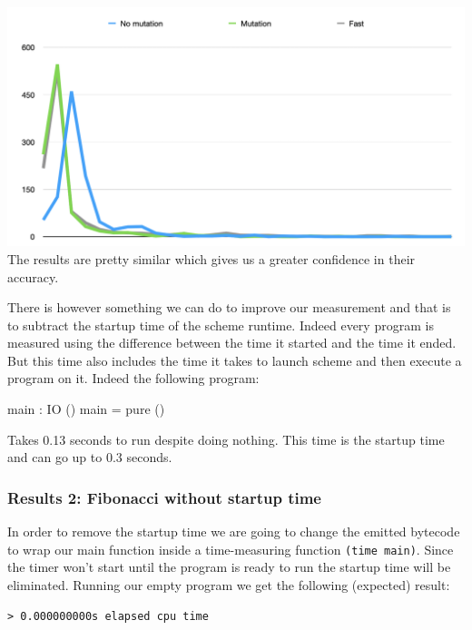 \documentclass[
]{article}
\newenvironment{Shaded}{}{}
\newcommand{\DataTypeTok}[1]{\textcolor[rgb]{0.56,0.13,0.00}{#1}}
\newcommand{\FunctionTok}[1]{\textcolor[rgb]{0.02,0.16,0.49}{#1}}
\newcommand{\NormalTok}[1]{#1}
\newcommand{\OperatorTok}[1]{\textcolor[rgb]{0.40,0.40,0.40}{#1}}
\newcommand{\OtherTok}[1]{\textcolor[rgb]{0.00,0.44,0.13}{#1}}
\begin{document}
\includegraphics{Screenshot 2020-08-25 at 18.00.17.png} The results are
pretty similar which gives us a greater confidence in their accuracy.

There is however something we can do to improve our measurement and that
is to subtract the startup time of the scheme runtime. Indeed every
program is measured using the difference between the time it started and
the time it ended. But this time also includes the time it takes to
launch scheme and then execute a program on it. Indeed the following
program:

\begin{Shaded}
\begin{Highlighting}[]
\NormalTok{main }\OperatorTok{:} \DataTypeTok{IO}\NormalTok{ ()}
\NormalTok{main }\OtherTok{=} \FunctionTok{pure}\NormalTok{ ()}
\end{Highlighting}
\end{Shaded}

Takes 0.13 seconds to run despite doing nothing. This time is the
startup time and can go up to 0.3 seconds.

\hypertarget{results-2-fibonacci-without-startup-time}{%
\subsubsection{Results 2: Fibonacci without startup
time}\label{results-2-fibonacci-without-startup-time}}

In order to remove the startup time we are going to change the emitted
bytecode to wrap our main function inside a time-measuring function
\texttt{(time\ main)}. Since the timer won't start until the program is
ready to run the startup time will be eliminated. Running our empty
program we get the following (expected) result:

\begin{verbatim}
> 0.000000000s elapsed cpu time
\end{verbatim}
\end{document}

